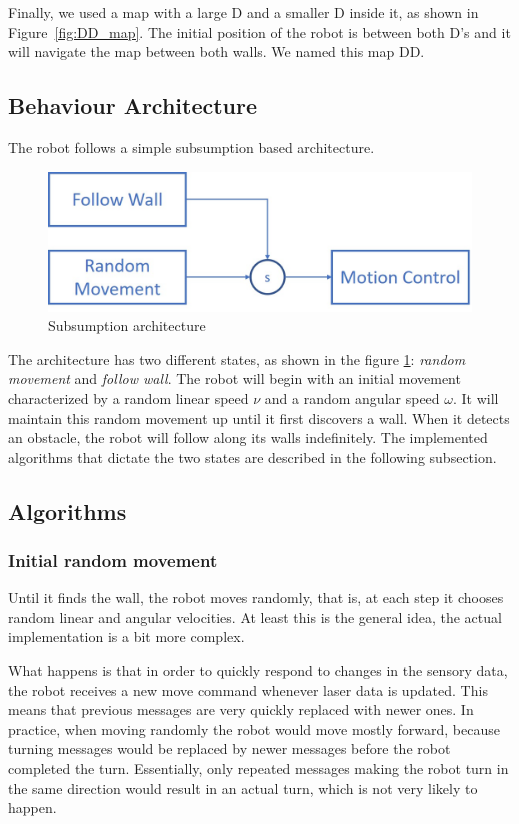 \documentclass[10pt,journal,compsoc]{IEEEtran}
\begin{document}
Finally, we used a map with a large D and a smaller D inside it, as shown in Figure~\ref{fig:DD_map}. The initial position of the robot is between both D's and it will navigate the map between both walls. We named this map DD.

\subsection{Behaviour Architecture}

The robot follows a simple subsumption based architecture.

\begin{figure}[thpb]
\centering
\includegraphics[scale=0.265]{img/architecture.jpg}
\caption{Subsumption architecture}
\label{fig:architecture}
\end{figure}

The architecture has two different states, as shown in the figure \ref{fig:architecture}: \textit{random movement} and \textit{follow wall}. The robot will begin with an initial movement characterized by a random linear speed $\nu$ and a random angular speed $\omega$. It will maintain this random movement up until it first discovers a wall. When it detects an obstacle, the robot will follow along its walls indefinitely. The implemented algorithms that dictate the two states are described in the following subsection. 


\subsection{Algorithms}
\subsubsection{Initial random movement}\label{subsec:initial}

Until it finds the wall, the robot moves randomly, that is, at each step it chooses random linear and angular velocities. At least this is the general idea, the actual implementation is a bit more complex. 

What happens is that in order to quickly respond to changes in the sensory data, the robot receives a new move command whenever laser data is updated. This means that previous messages are very quickly replaced with newer ones. In practice, when moving randomly the robot would move mostly forward, because turning messages would be replaced by newer messages before the robot completed the turn. Essentially, only repeated messages making the robot turn in the same direction would result in an actual turn, which is not very likely to happen.
\end{document}
